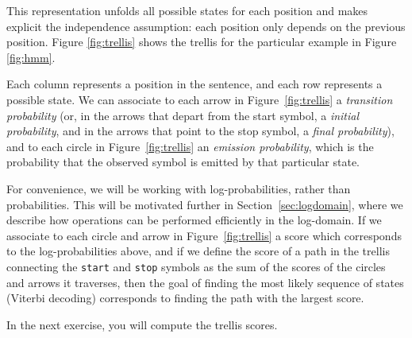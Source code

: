 This representation unfolds all possible states for each position and
makes explicit the independence assumption: each position only
depends on the previous position. Figure \ref{fig:trellis} shows the
trellis for the particular example in Figure \ref{fig:hmm}. 


Each column represents a position in the sentence, and each row represents a possible state. 
We can associate to each arrow in 
Figure~\ref{fig:trellis} a \emph{transition 
probability} (or, in the arrows that depart from 
the start symbol, a \emph{initial probability}, and 
in the arrows that point to 
the stop symbol, a \emph{final probability}), 
and to each circle in 
Figure~\ref{fig:trellis} an 
\emph{emission probability}, 
which is the probability that the observed symbol is emitted by that particular state.

For convenience, we will be working with 
log-probabilities, rather than probabilities.
This will be motivated further in Section~\ref{sec:logdomain}, where we describe 
how operations can be performed efficiently
in the log-domain. 
If we associate to each circle and arrow in
Figure~\ref{fig:trellis} a score which corresponds
to the log-probabilities above, 
and if we define the score of a path in the trellis
connecting the {\tt start} and  {\tt stop} symbols as
the sum of the scores of the circles and arrows
it traverses, 
then 
the goal of finding the most likely sequence of states (Viterbi decoding) corresponds to 
finding the path with the largest score.

In the next exercise, you will compute the trellis scores.



